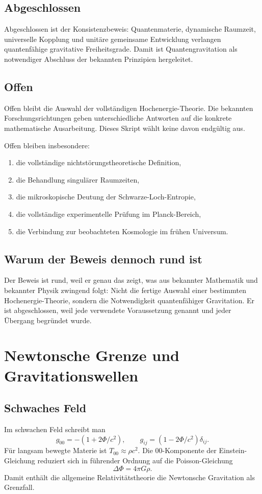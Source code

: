 \documentclass[11pt,a4paper,openany]{book}
\theoremstyle{remark}
\begin{document}
\section{Abgeschlossen}
Abgeschlossen ist der Konsistenzbeweis: Quantenmaterie, dynamische Raumzeit, universelle Kopplung und unitäre gemeinsame Entwicklung verlangen quantenfähige gravitative Freiheitsgrade. Damit ist Quantengravitation als notwendiger Abschluss der bekannten Prinzipien hergeleitet.

\section{Offen}
Offen bleibt die Auswahl der vollständigen Hochenergie-Theorie. Die bekannten Forschungsrichtungen geben unterschiedliche Antworten auf die konkrete mathematische Ausarbeitung. Dieses Skript wählt keine davon endgültig aus.

Offen bleiben insbesondere:
\begin{enumerate}
\item die vollständige nichtstörungstheoretische Definition,
\item die Behandlung singulärer Raumzeiten,
\item die mikroskopische Deutung der Schwarze-Loch-Entropie,
\item die vollständige experimentelle Prüfung im Planck-Bereich,
\item die Verbindung zur beobachteten Kosmologie im frühen Universum.
\end{enumerate}

\section{Warum der Beweis dennoch rund ist}
Der Beweis ist rund, weil er genau das zeigt, was aus bekannter Mathematik und bekannter Physik zwingend folgt: Nicht die fertige Auswahl einer bestimmten Hochenergie-Theorie, sondern die Notwendigkeit quantenfähiger Gravitation. Er ist abgeschlossen, weil jede verwendete Voraussetzung genannt und jeder Übergang begründet wurde.



\chapter{Newtonsche Grenze und Gravitationswellen}
\section{Schwaches Feld}
Im schwachen Feld schreibt man
\begin{equation}
g_{00}=-(1+2\Phi/c^2),\qquad g_{ij}=(1-2\Phi/c^2)\delta_{ij}.
\end{equation}
Für langsam bewegte Materie ist $T_{00}\approx \rho c^2$. Die $00$-Komponente der Einstein-Gleichung reduziert sich in führender Ordnung auf die Poisson-Gleichung
\begin{equation}
\Delta \Phi=4\pi G\rho.
\end{equation}
Damit enthält die allgemeine Relativitätstheorie die Newtonsche Gravitation als Grenzfall.
\end{document}
